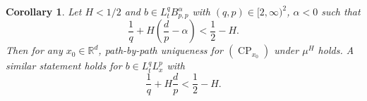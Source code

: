 \documentclass[10pt]{article}
\newcommand{\tmop}[1]{\ensuremath{\operatorname{#1}}}
\newtheorem{corollary}{Corollary}
\begin{document}
\begin{corollary}
  \label{sec4.2.3 corollary path uniqueness}Let $H < 1 / 2$ and $b \in L^q_t
  B^{\alpha}_{p, p}$ with $(q, p) \in [2, \infty)^2$, $\alpha < 0$ such that
  \begin{equation}
    \frac{1}{q} + H \left( \frac{d}{p} - \alpha \right) < \frac{1}{2} - H.
    \label{sec4.2.3 generalized condition}
  \end{equation}
  Then for any $x_0 \in \mathbb{R}^d$, path\mbox{-}by\mbox{-}path uniqueness
  for $(\tmop{CP}_{x_0})$ under $\mu^H$ holds. A similar statement holds for
  $b \in L^q_t L^p_x$ with
  \begin{equation}
    \frac{1}{q} + H \frac{d}{p} < \frac{1}{2} - H. \label{sec4.2.3 qp
    condition}
  \end{equation}
\end{corollary}
\end{document}
